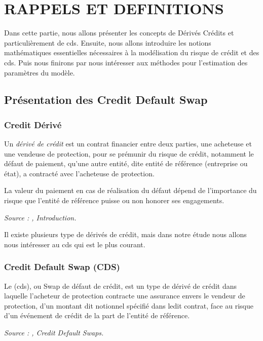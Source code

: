 
\part{RAPPELS ET DEFINITIONS}

Dans cette partie, nous allons présenter les concepts de Dérivés Crédits et particulièrement de \gls{cds}. Ensuite, nous allons introduire les notions mathématiques essentielles nécessaires à la modélisation du risque de crédit et des \gls{cds}. Puis nous finirons par nous intéresser aux méthodes pour l'estimation des paramètres du modèle.


\chapter{Présentation des Credit Default Swap}

\section{Credit Dérivé}

\begin{definition}\label{def:credit_derive}
Un \emph{dérivé de crédit} est un contrat financier entre deux parties, une acheteuse et une vendeuse de protection, pour se prémunir du risque de crédit, notamment le défaut de paiement, qu'une autre entité, dite entité de référence (entreprise ou état), a contracté avec l'acheteuse de protection.

La valeur du paiement en cas de réalisation du défaut dépend de l'importance du risque que l'entité de référence puisse ou non honorer ses engagements.

\noindent\textit{Source : \cite{credit_derivatives_handbook}, Introduction.}
\end{definition}

Il existe plusieurs type de dérivés de crédit, mais dans notre étude nous allons nous intéresser au \gls{cds} qui est le plus courant.


\section{Credit Default Swap (CDS)}

\begin{definition}\label{def:CDS}
Le  (\gls{cds}), ou Swap de défaut de crédit, est un type de dérivé de crédit dans laquelle l'acheteur de protection contracte une assurance envers le vendeur de protection, d'un montant dit notionnel spécifié dans ledit contrat, face au risque d'un événement de crédit de la part de l'entité de référence.

\noindent\textit{Source : \cite{art_of_credit_derivatives}, Credit Default Swaps.}
\end{definition}

